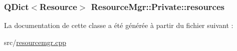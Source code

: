 \subsubsection[{resources}]{\setlength{\rightskip}{0pt plus 5cm}Q\+Dict$<${\bf Resource}$>$ Resource\+Mgr\+::\+Private\+::resources}\label{class_resource_mgr_1_1_private_adf85c972df9ed3713c659f899fffa9f6}


La documentation de cette classe a été générée à partir du fichier suivant \+:\begin{DoxyCompactItemize}
\item 
src/\hyperlink{resourcemgr_8cpp}{resourcemgr.\+cpp}\end{DoxyCompactItemize}
